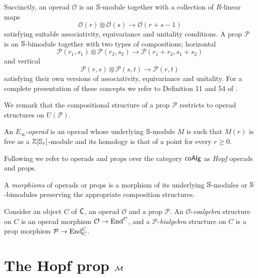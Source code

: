 Succinctly, an operad $\mathcal O$ is an $\S$-module together with a collection of $R$-linear maps
\begin{equation*}
\mathcal O(r) \otimes \mathcal O(s) \to \mathcal O(r+s-1)
\end{equation*}
satisfying suitable associativity, equivariance and unitality conditions.
A prop $\mathcal P$ is an $\S$-bimodule together with two types of compositions; horizontal
\begin{equation*}
\mathcal P(r_1, s_1) \otimes \mathcal P(r_2, s_2) \to \mathcal P(r_1 + r_2, s_1 + s_2)
\end{equation*}
and vertical
\begin{equation*}
\mathcal P(r,s) \otimes \mathcal P(s, t) \to \mathcal P(r, t)
\end{equation*}
satisfying their own versions of associativity, equivariance and unitality.
For a complete presentation of these concepts we refer to Definition 11 and 54 of \cite{Markl08}.

We remark that the compositional structure of a prop $\mathcal P$ restricts to operad structures on $U(\mathcal P)$.

An $E_\infty$-\textit{operad} is an operad whose underlying $\S$-module $M$ is such that $M(r)$ is free as a $\Z[\S_r]$-module and its homology is that of a point for every $r \geq 0$.

Following \cite{Getzler1994operads, Moerdijk1999monads} we refer to operads and props over the category $\coAlg$ as \textit{Hopf} operads and props.

A \textit{morphisms} of operads or props is a morphism of its underlying $\S$-modules or $\S$-bimodules preserving the appropriate composition structures.

Consider an object $C$ of $\C$, an operad $\mathcal O$ and a prop $\mathcal P$.
An $\mathcal O$-\textit{coalgebra} structure on $C$ is an operad morphism $\mathcal O \to \End^C$, and a $\mathcal P$-\textit{bialgebra} structure on $C$ is a prop morphism $\mathcal P \to \End_C^C$.

\section{The Hopf prop $\M$}

